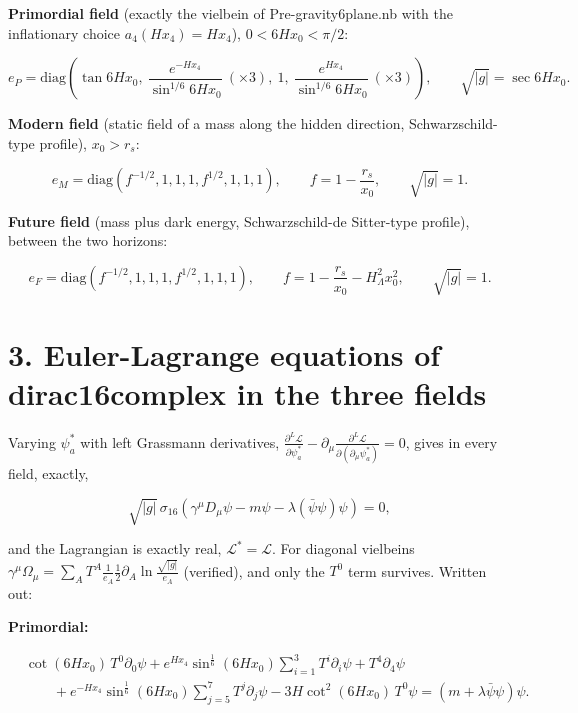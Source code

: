 \documentclass[10pt]{article}
\makeatletter
\newcommand\keepnext{\par\nopagebreak\@nobreaktrue\everypar{\@nobreakfalse\everypar{}}}
\makeatother
\begin{document}
\textbf{Primordial field} (exactly the vielbein of Pre-gravity6plane.nb with the inflationary choice $a_4(Hx_4) = Hx_4$), $0 < 6Hx_0 < \pi/2$:\keepnext


\[
e_P = \mathrm{diag}\left(\tan 6Hx_0,\ \frac{e^{-Hx_4}}{\sin^{1/6}6Hx_0}\ (\times3),\ 1,\ \frac{e^{Hx_4}}{\sin^{1/6}6Hx_0}\ (\times3)\right),\qquad \sqrt{\lvert g\rvert} = \sec 6Hx_0 .
\]

\textbf{Modern field} (static field of a mass along the hidden direction, Schwarzschild-type profile), $x_0 > r_s$:\keepnext


\[
e_M = \mathrm{diag}\left(f^{-1/2}, 1, 1, 1, f^{1/2}, 1, 1, 1\right),\qquad f = 1 - \frac{r_s}{x_0},\qquad \sqrt{\lvert g\rvert} = 1 .
\]

\textbf{Future field} (mass plus dark energy, Schwarzschild-de Sitter-type profile), between the two horizons:\keepnext


\[
e_F = \mathrm{diag}\left(f^{-1/2}, 1, 1, 1, f^{1/2}, 1, 1, 1\right),\qquad f = 1 - \frac{r_s}{x_0} - H_\Lambda^2x_0^2,\qquad \sqrt{\lvert g\rvert} = 1 .
\]

\section*{3. Euler-Lagrange equations of dirac16complex in the three fields}

Varying $\psi_a^{*}$ with left Grassmann derivatives, $\frac{\partial^L\mathcal L}{\partial\psi^*_a} - \partial_\mu\frac{\partial^L\mathcal L}{\partial(\partial_\mu\psi^*_a)} = 0$, gives in every field, exactly,\keepnext


\[
\sqrt{\lvert g\rvert}\,\sigma_{16}\left(\gamma^\mu D_\mu\psi - m\psi - \lambda(\bar\psi\psi)\psi\right) = 0,
\]

and the Lagrangian is exactly real, $\mathcal L^* = \mathcal L$. For diagonal vielbeins $\gamma^\mu\Omega_\mu = \sum_A T^A\frac{1}{e_A}\frac12\partial_A\ln\frac{\sqrt{\lvert g\rvert}}{e_A}$ (verified), and only the $T^0$ term survives. Written out:\keepnext


\textbf{Primordial:}\keepnext


\[
\begin{aligned}
&\cot(6Hx_0)\,T^0\partial_0\psi + e^{Hx_4}\sin^{\frac16}(6Hx_0)\sum_{i=1}^{3}T^i\partial_i\psi + T^4\partial_4\psi \\
&\qquad + e^{-Hx_4}\sin^{\frac16}(6Hx_0)\sum_{j=5}^{7}T^j\partial_j\psi - 3H\cot^2(6Hx_0)\,T^0\psi = (m + \lambda\bar\psi\psi)\psi .
\end{aligned}
\]
\end{document}
